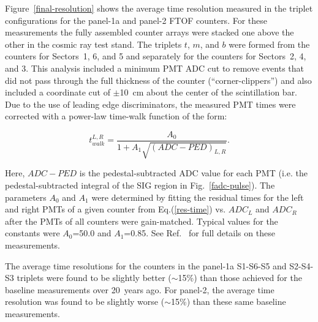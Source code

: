 \documentclass{elsart}
\begin{document}
Figure~\ref{final-resolution} shows the average time resolution measured in the triplet configurations
for the panel-1a and panel-2 FTOF counters. For these measurements the fully assembled counter arrays
were stacked one above the other in the cosmic ray test stand. The triplets $t$, $m$, and $b$ were
formed from the counters for Sectors~1, 6, and 5 and separately for the counters for Sectors~2, 4, and
3. This analysis included a minimum PMT ADC cut to remove events that did not pass through the full
thickness of the counter (``corner-clippers'') and also included a coordinate cut of $\pm$10~cm about
the center of the scintillation bar. Due to the use of leading edge discriminators, the measured PMT times
were corrected with a power-law time-walk function of the form:

\begin{equation}
\label{walk-function}
t_{walk}^{L,R} = \frac{A_0}{1 + A_1 \sqrt{(ADC - PED)_{L,R}}}.
\end{equation}

\noindent
Here, $ADC - PED$ is the pedestal-subtracted ADC value for each PMT (i.e. the pedestal-subtracted integral
of the SIG region in Fig.~\ref{fadc-pulse}). The parameters $A_0$ and $A_1$ were determined by fitting
the residual times for the left and right PMTs of a given counter from Eq.(\ref{res-time}) vs. $ADC_L$ and
$ADC_R$ after the PMTs of all counters were gain-matched. Typical values for the constants were $A_0$=50.0
and $A_1$=0.85. See Ref.~\cite{dsc-cn2013-001} for full details on these measurements.

The average time resolutions for the counters in the panel-1a S1-S6-S5 and S2-S4-S3 triplets were
found to be slightly better ($\sim$15\%) than those achieved for the baseline measurements over
20~years ago. For panel-2, the average time resolution was found to be slightly worse ($\sim$15\%)
than these same baseline measurements.
\end{document}
